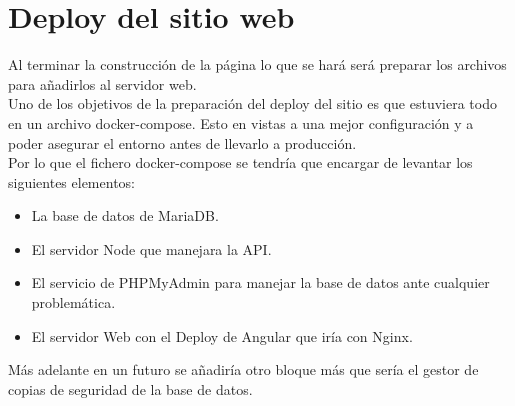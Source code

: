 \chapter{Deploy del sitio web}
Al terminar la construcción de la página lo que se hará será preparar los archivos para añadirlos al servidor web.
\\Uno de los objetivos de la preparación del deploy del sitio es que estuviera todo en un archivo docker-compose. Esto en vistas a una mejor configuración y a poder asegurar el entorno antes de llevarlo a producción.
\\Por lo que el fichero docker-compose se tendría que encargar de levantar los siguientes elementos:

\begin{itemize}
    \item La base de datos de MariaDB.
    \item El servidor Node que manejara la API.
    \item El servicio de PHPMyAdmin para manejar la base de datos ante cualquier problemática.
    \item El servidor Web con el Deploy de Angular que iría con Nginx.
\end{itemize}

Más adelante en un futuro se añadiría otro bloque más que sería el gestor de copias de seguridad de la base de datos.

